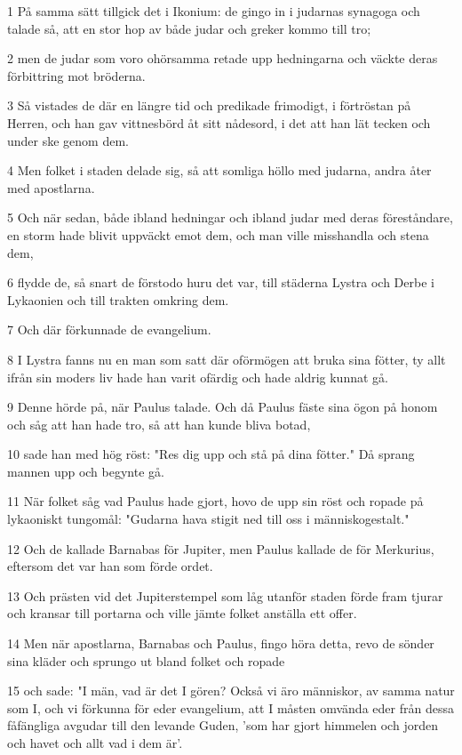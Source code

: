\par 1 På samma sätt tillgick det i Ikonium: de gingo in i judarnas synagoga och talade så, att en stor hop av både judar och greker kommo till tro;
\par 2 men de judar som voro ohörsamma retade upp hedningarna och väckte deras förbittring mot bröderna.
\par 3 Så vistades de där en längre tid och predikade frimodigt, i förtröstan på Herren, och han gav vittnesbörd åt sitt nådesord, i det att han lät tecken och under ske genom dem.
\par 4 Men folket i staden delade sig, så att somliga höllo med judarna, andra åter med apostlarna.
\par 5 Och när sedan, både ibland hedningar och ibland judar med deras föreståndare, en storm hade blivit uppväckt emot dem, och man ville misshandla och stena dem,
\par 6 flydde de, så snart de förstodo huru det var, till städerna Lystra och Derbe i Lykaonien och till trakten omkring dem.
\par 7 Och där förkunnade de evangelium.
\par 8 I Lystra fanns nu en man som satt där oförmögen att bruka sina fötter, ty allt ifrån sin moders liv hade han varit ofärdig och hade aldrig kunnat gå.
\par 9 Denne hörde på, när Paulus talade. Och då Paulus fäste sina ögon på honom och såg att han hade tro, så att han kunde bliva botad,
\par 10 sade han med hög röst: "Res dig upp och stå på dina fötter." Då sprang mannen upp och begynte gå.
\par 11 När folket såg vad Paulus hade gjort, hovo de upp sin röst och ropade på lykaoniskt tungomål: "Gudarna hava stigit ned till oss i människogestalt."
\par 12 Och de kallade Barnabas för Jupiter, men Paulus kallade de för Merkurius, eftersom det var han som förde ordet.
\par 13 Och prästen vid det Jupiterstempel som låg utanför staden förde fram tjurar och kransar till portarna och ville jämte folket anställa ett offer.
\par 14 Men när apostlarna, Barnabas och Paulus, fingo höra detta, revo de sönder sina kläder och sprungo ut bland folket och ropade
\par 15 och sade: "I män, vad är det I gören? Också vi äro människor, av samma natur som I, och vi förkunna för eder evangelium, att I måsten omvända eder från dessa fåfängliga avgudar till den levande Guden, 'som har gjort himmelen och jorden och havet och allt vad i dem är'.
